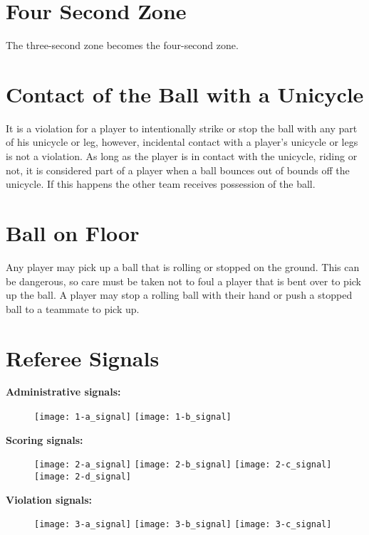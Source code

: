 \section{Four Second Zone}
The three-second zone becomes the four-second zone.

\section{Contact of the Ball with a Unicycle}
It is a violation for a player to intentionally strike or stop the ball with any part of his unicycle or leg, however, incidental contact with a player's unicycle or legs is not a violation.
As long as the player is in contact with the unicycle, riding or not, it is considered part of a player when a ball bounces out of bounds off the unicycle.
If this happens the other team receives possession of the ball.

\section{Ball on Floor}
Any player may pick up a ball that is rolling or stopped on the ground.
This can be dangerous, so care must be taken not to foul a player that is bent over to pick up the ball.
A player may stop a rolling ball with their hand or push a stopped ball to a teammate to pick up.

\newpage

\section{Referee Signals}

\textbf{Administrative signals:}

\begin{figure}[h]
\texttt{[image: 1-a\_signal]}
\texttt{[image: 1-b\_signal]}
\end{figure}

\textbf{Scoring signals:}
\begin{figure}[h]
\texttt{[image: 2-a\_signal]}
\texttt{[image: 2-b\_signal]}
\texttt{[image: 2-c\_signal]}
\texttt{[image: 2-d\_signal]}
\end{figure}

\textbf{Violation signals:}

\begin{figure}[h]
\texttt{[image: 3-a\_signal]}
\texttt{[image: 3-b\_signal]}
\texttt{[image: 3-c\_signal]}

\end{figure}
